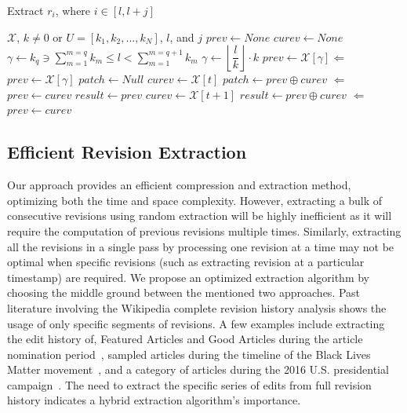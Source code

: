 \documentclass[acmsmall]{acmart}
\begin{document}
\begin{algorithm}
\centering
\caption{Extract $r_i$, where  $i \in [l, l+j]$}\label{alg:comp}
\begin{algorithmic}
\REQUIRE $\mathcal{X}$,  $k \neq 0$ or $U = [k_1, k_2, ..., k_N]$, $l$, and $j$
\STATE $prev \leftarrow None$
\STATE $curev \leftarrow None$
\STATE $\gamma \leftarrow k_q \ni \sum \limits_{m=1}^{m=q} k_m \leq l < \sum \limits_{m=1}^{m=q+1} k_m$ 
\ELSE
\STATE $\gamma \leftarrow \left\lfloor \dfrac{l}{k} \right\rfloor \cdot k$ 
\ENDIF
{}
\STATE $prev \leftarrow \mathcal{X}[\gamma] \Leftarrow$ 
\ELSE
\STATE $prev \leftarrow \mathcal{X}[\gamma]$
\STATE $patch \leftarrow Null$
\STATE $curev \leftarrow \mathcal{X}[t]$
\STATE $patch \leftarrow prev \oplus curev$ $\Leftarrow$ 
\STATE $prev \leftarrow curev$
\ENDFOR
\ENDIF
{} 
\STATE $result \leftarrow prev$
\STATE $curev \leftarrow \mathcal{X}[t+1]$
\STATE $result \leftarrow prev \oplus curev$ $\Leftarrow$ 
\STATE $prev \leftarrow curev$
\ENDWHILE
\end{algorithmic}
\end{algorithm}


\subsection{Efficient Revision Extraction}
Our approach provides an efficient compression and extraction method, optimizing both the time and space complexity. However, extracting a bulk of consecutive revisions using random extraction will be highly inefficient as it will require the computation of previous revisions multiple times. Similarly, extracting all the revisions in a single pass by processing one revision at a time may not be optimal when specific revisions (such as extracting revision at a particular timestamp) are required. We propose an optimized extraction algorithm by choosing the middle ground between the mentioned two approaches. Past literature involving the Wikipedia complete revision history analysis shows the usage of only specific segments of revisions. A few examples include extracting the edit history of, Featured Articles and Good Articles during the article nomination period~\cite{zhang2017crowd}, sampled articles during the timeline of the Black Lives Matter movement~\cite{twyman2017black}, and a category of articles during the 2016 U.S. presidential campaign~\cite{keegan2019dynamics}. The need to extract the specific series of edits from full revision history indicates a hybrid extraction algorithm's importance.
\end{document}
